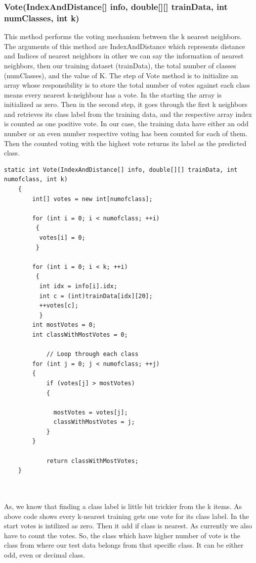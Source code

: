 \documentclass[conference]{IEEEtran}
\begin{document}
\subsubsection{Vote(IndexAndDistance[] info, double[][] trainData, int numClasses, int k)}
This method performs the voting mechanism between the k nearest neighbors. The arguments of this method are IndexAndDistance which represents distance and Indices of nearest neighbors in other we can say the information of nearest neighbors, then our training dataset (trainData), the total number of classes (numClasses), and the value of K. The step of Vote method is to initialize an array whose responsibility is to store the total number of votes against each class means every nearest k-neighbour has a vote. In the starting the array is initialized as zero. Then in the second step, it goes through the first k neighbors and retrieves its class label from the training data, and the respective array index is counted as one positive vote. In our case, the training data have either an odd number or an even number respective voting has been counted for each of them. Then the counted voting with the highest vote returns its label as the predicted class. 

\begin{lstlisting}
static int Vote(IndexAndDistance[] info, double[][] trainData, int numofclass, int k)
    {
        int[] votes = new int[numofclass];

        for (int i = 0; i < numofclass; ++i)
         {
          votes[i] = 0;
         }

        for (int i = 0; i < k; ++i)
         {
          int idx = info[i].idx;
          int c = (int)trainData[idx][20];
          ++votes[c];
          }
        int mostVotes = 0;
        int classWithMostVotes = 0;

            // Loop through each class
        for (int j = 0; j < numofclass; ++j)
        {
            if (votes[j] > mostVotes)
            {
                 
              mostVotes = votes[j];
              classWithMostVotes = j;
            }
        }

            return classWithMostVotes;
    }



\end{lstlisting}


As, we know that finding a class label is little bit trickier from the k items. As above code shows every k-nearest training gets one vote for its class label. In the start votes is intilized as zero. Then it add if class is nearest.  As currently we also have to count the votes. So, the class which have higher number of vote is the class from where our test data belongs from that specific class. It can be either odd, even or decimal class. 
\end{document}
